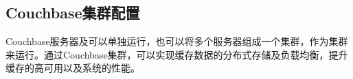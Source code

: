 







\subsection{Couchbase集群配置}
Couchbase服务器及可以单独运行，也可以将多个服务器组成一个集群，作为集群来运行。通过Couchbase集群，可以实现缓存数据的分布式存储及负载均衡，提升缓存的高可用以及系统的性能\cite{brown2013developing}。

